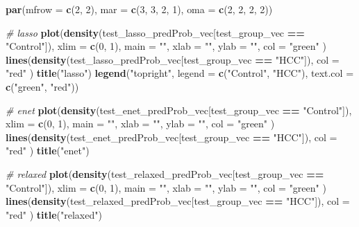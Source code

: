 \documentclass[
]{book}
\newenvironment{Shaded}{\begin{snugshade}}{\end{snugshade}}
\newcommand{\CommentTok}[1]{\textcolor[rgb]{0.56,0.35,0.01}{\textit{#1}}}
\newcommand{\DataTypeTok}[1]{\textcolor[rgb]{0.13,0.29,0.53}{#1}}
\newcommand{\DecValTok}[1]{\textcolor[rgb]{0.00,0.00,0.81}{#1}}
\newcommand{\KeywordTok}[1]{\textcolor[rgb]{0.13,0.29,0.53}{\textbf{#1}}}
\newcommand{\NormalTok}[1]{#1}
\newcommand{\OperatorTok}[1]{\textcolor[rgb]{0.81,0.36,0.00}{\textbf{#1}}}
\newcommand{\StringTok}[1]{\textcolor[rgb]{0.31,0.60,0.02}{#1}}
\begin{document}
\begin{Shaded}
\begin{Highlighting}[]
\KeywordTok{par}\NormalTok{(}\DataTypeTok{mfrow =} \KeywordTok{c}\NormalTok{(}\DecValTok{2}\NormalTok{, }\DecValTok{2}\NormalTok{), }\DataTypeTok{mar =} \KeywordTok{c}\NormalTok{(}\DecValTok{3}\NormalTok{, }\DecValTok{3}\NormalTok{, }\DecValTok{2}\NormalTok{, }\DecValTok{1}\NormalTok{), }\DataTypeTok{oma =} \KeywordTok{c}\NormalTok{(}\DecValTok{2}\NormalTok{, }\DecValTok{2}\NormalTok{, }\DecValTok{2}\NormalTok{, }\DecValTok{2}\NormalTok{))}

\CommentTok{\# lasso}
\KeywordTok{plot}\NormalTok{(}\KeywordTok{density}\NormalTok{(test\_lasso\_predProb\_vec[test\_group\_vec }\OperatorTok{==}\StringTok{ "Control"}\NormalTok{]),}
  \DataTypeTok{xlim =} \KeywordTok{c}\NormalTok{(}\DecValTok{0}\NormalTok{, }\DecValTok{1}\NormalTok{), }\DataTypeTok{main =} \StringTok{""}\NormalTok{, }\DataTypeTok{xlab =} \StringTok{""}\NormalTok{, }\DataTypeTok{ylab =} \StringTok{""}\NormalTok{, }\DataTypeTok{col =} \StringTok{"green"}
\NormalTok{)}
\KeywordTok{lines}\NormalTok{(}\KeywordTok{density}\NormalTok{(test\_lasso\_predProb\_vec[test\_group\_vec }\OperatorTok{==}\StringTok{ "HCC"}\NormalTok{]),}
  \DataTypeTok{col =} \StringTok{"red"}
\NormalTok{)}
\KeywordTok{title}\NormalTok{(}\StringTok{"lasso"}\NormalTok{)}
\KeywordTok{legend}\NormalTok{(}\StringTok{"topright"}\NormalTok{, }\DataTypeTok{legend =} \KeywordTok{c}\NormalTok{(}\StringTok{"Control"}\NormalTok{, }\StringTok{"HCC"}\NormalTok{), }\DataTypeTok{text.col =} \KeywordTok{c}\NormalTok{(}\StringTok{"green"}\NormalTok{, }\StringTok{"red"}\NormalTok{))}

\CommentTok{\# enet}
\KeywordTok{plot}\NormalTok{(}\KeywordTok{density}\NormalTok{(test\_enet\_predProb\_vec[test\_group\_vec }\OperatorTok{==}\StringTok{ "Control"}\NormalTok{]),}
  \DataTypeTok{xlim =} \KeywordTok{c}\NormalTok{(}\DecValTok{0}\NormalTok{, }\DecValTok{1}\NormalTok{), }\DataTypeTok{main =} \StringTok{""}\NormalTok{, }\DataTypeTok{xlab =} \StringTok{""}\NormalTok{, }\DataTypeTok{ylab =} \StringTok{""}\NormalTok{, }\DataTypeTok{col =} \StringTok{"green"}
\NormalTok{)}
\KeywordTok{lines}\NormalTok{(}\KeywordTok{density}\NormalTok{(test\_enet\_predProb\_vec[test\_group\_vec }\OperatorTok{==}\StringTok{ "HCC"}\NormalTok{]),}
  \DataTypeTok{col =} \StringTok{"red"}
\NormalTok{)}
\KeywordTok{title}\NormalTok{(}\StringTok{"enet"}\NormalTok{)}

\CommentTok{\# relaxed}
\KeywordTok{plot}\NormalTok{(}\KeywordTok{density}\NormalTok{(test\_relaxed\_predProb\_vec[test\_group\_vec }\OperatorTok{==}\StringTok{ "Control"}\NormalTok{]),}
  \DataTypeTok{xlim =} \KeywordTok{c}\NormalTok{(}\DecValTok{0}\NormalTok{, }\DecValTok{1}\NormalTok{), }\DataTypeTok{main =} \StringTok{""}\NormalTok{, }\DataTypeTok{xlab =} \StringTok{""}\NormalTok{, }\DataTypeTok{ylab =} \StringTok{""}\NormalTok{, }\DataTypeTok{col =} \StringTok{"green"}
\NormalTok{)}
\KeywordTok{lines}\NormalTok{(}\KeywordTok{density}\NormalTok{(test\_relaxed\_predProb\_vec[test\_group\_vec }\OperatorTok{==}\StringTok{ "HCC"}\NormalTok{]),}
  \DataTypeTok{col =} \StringTok{"red"}
\NormalTok{)}
\KeywordTok{title}\NormalTok{(}\StringTok{"relaxed"}\NormalTok{)}


\end{Highlighting}
\end{Shaded}
\end{document}
